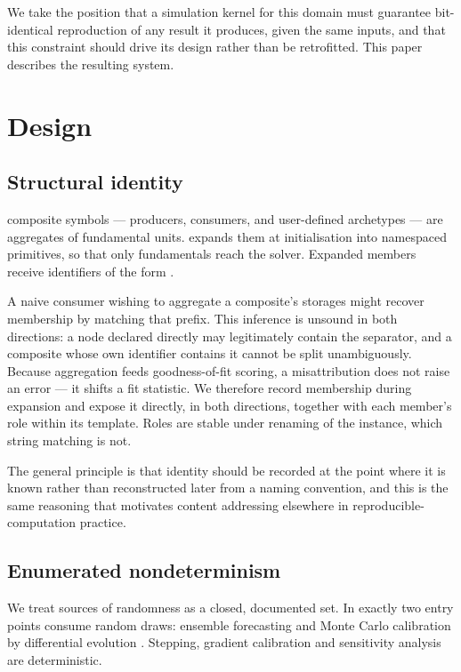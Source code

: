 \documentclass[11pt,a4paper]{article}
\begin{document}
We take the position that a simulation kernel for this domain must guarantee bit-identical reproduction of any result it produces, given the same inputs, and that this constraint should drive its design rather than be retrofitted. This paper describes the resulting system.

\section{Design}

\subsection{Structural identity}

\esl{} composite symbols --- producers, consumers, and user-defined archetypes --- are aggregates of fundamental units. \gssk{} expands them at initialisation into namespaced primitives, so that only fundamentals reach the solver. Expanded members receive identifiers of the form .

A naive consumer wishing to aggregate a composite's storages might recover membership by matching that prefix. This inference is unsound in both directions: a node declared directly may legitimately contain the separator, and a composite whose own identifier contains it cannot be split unambiguously. Because aggregation feeds goodness-of-fit scoring, a misattribution does not raise an error --- it shifts a fit statistic. We therefore record membership during expansion and expose it directly, in both directions, together with each member's role within its template. Roles are stable under renaming of the instance, which string matching is not.

The general principle is that identity should be recorded at the point where it is known rather than reconstructed later from a naming convention, and this is the same reasoning that motivates content addressing elsewhere in reproducible-computation practice.

\subsection{Enumerated nondeterminism}

We treat sources of randomness as a closed, documented set. In \gssk{} exactly two entry points consume random draws: ensemble forecasting and Monte Carlo calibration by differential evolution \citep{storn1997}. Stepping, gradient calibration and sensitivity analysis are deterministic.
\end{document}
